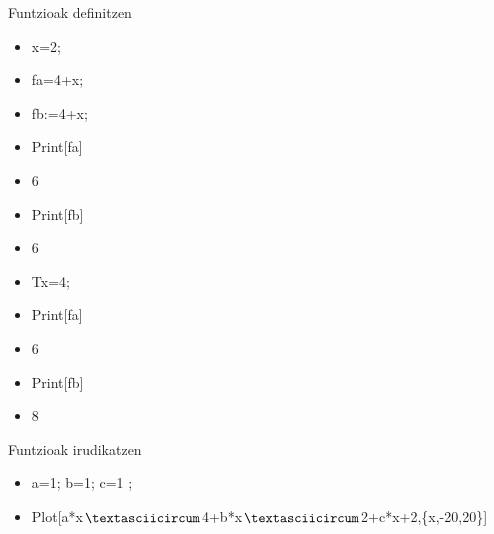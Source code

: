 \documentclass[xcolor=x11names,table]{beamer}
\begin{document}
\begin{frame}{Funtzioak definitzen}

\begin{mdframed}[backgroundcolor=gray!05,roundcorner=2pt]

	\begin{itemize}
		\item<1-> x=2;
		\item<1->  fa=4+x;
		\item<1->  fb:=4+x;
		\item<1-> Print[fa]


		\item<2-> 6


		\item<3-> Print[fb]


		\item<4->  6


		\item<5-> T{x}=4;
		\item<5-> Print[fa]

		\item<6-> 6

			\item<7-> Print[fb]


		\item<8-> 8
	\end{itemize}
\end{mdframed}
\end{frame}


\begin{frame}{Funtzioak irudikatzen}

	\begin{itemize}
		\item<2-> a=1; b=1; c=1 ;
		\item<1-> Plot[a*x$\textasciicircum$4+b*x$\textasciicircum$2+c*x+2,\{x,-20,20\}] 
	\end{itemize}

	\begin{center}
	\end{center}
\end{frame}
\end{document}
